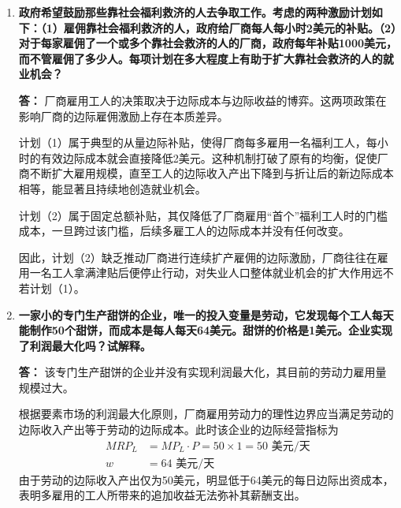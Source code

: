 \begin{enumerate}[label=\textbf{\arabic*.}, leftmargin=*]
		\textbf{答：}
		现行的单向挑选制度在实质上限制了球员的选择权，使球队所有者联合结成了买方垄断卡特尔，压低了球员的协商薪酬。
		
		一旦该挑选制度被废除，各球队之间为了争夺优秀人才将展开自由竞争，新球员市场将由买方垄断直接转变为完全竞争市场。
		
		在竞争重组后，新挑选球员的工资将大幅上涨，直至等同于其创造的边际收入产出，买方垄断剥蚀租金将不复存在。
		
		相比之下，老球员由于此前已获得自由球员身份，本身就具备较强的市场议价能力并已拿到了市场均衡高薪，因此该制度废除对老球员工资的影响较为有限。
		
		\item \textbf{政府希望鼓励那些靠社会福利救济的人去争取工作。考虑的两种激励计划如下：（1）雇佣靠社会福利救济的人，政府给厂商每人每小时2美元的补贴。（2）对于每家雇佣了一个或多个靠社会救济的人的厂商，政府每年补贴1000美元，而不管雇佣了多少人。每项计划在多大程度上有助于扩大靠社会救济的人的就业机会？}
		
		\textbf{答：}
		厂商雇用工人的决策取决于边际成本与边际收益的博弈。这两项政策在影响厂商的边际雇佣激励上存在本质差异。
		
		计划（1）属于典型的从量边际补贴，使得厂商每多雇用一名福利工人，每小时的有效边际成本就会直接降低2美元。这种机制打破了原有的均衡，促使厂商不断扩大雇用规模，直至工人的边际收入产出下降到与折让后的新边际成本相等，能显著且持续地创造就业机会。
		
		计划（2）属于固定总额补贴，其仅降低了厂商雇用“首个”福利工人时的门槛成本，一旦跨过该门槛，后续多雇工人的边际成本并没有任何改变。
		
		因此，计划（2）缺乏推动厂商进行连续扩产雇佣的边际激励，厂商往往在雇用一名工人拿满津贴后便停止行动，对失业人口整体就业机会的扩大作用远不若计划（1）。
		
		\item \textbf{一家小的专门生产甜饼的企业，唯一的投入变量是劳动，它发现每个工人每天能制作50个甜饼，而成本是每人每天64美元。甜饼的价格是1美元。企业实现了利润最大化吗？试解释。}
		
		\textbf{答：}
		该专门生产甜饼的企业并没有实现利润最大化，其目前的劳动力雇用量规模过大。
		
		根据要素市场的利润最大化原则，厂商雇用劳动力的理性边界应当满足劳动的边际收入产出等于劳动的边际成本。此时该企业的边际经营指标为
		\[
		\begin{aligned}
			MRP_L &= MP_L \cdot P = 50 \times 1 = 50 \text{ 美元/天} \\
			w &= 64 \text{ 美元/天}
		\end{aligned}
		\]
		由于劳动的边际收入产出仅为50美元，明显低于64美元的每日边际出资成本，表明多雇用的工人所带来的追加收益无法弥补其薪酬支出。
		

\end{enumerate}
